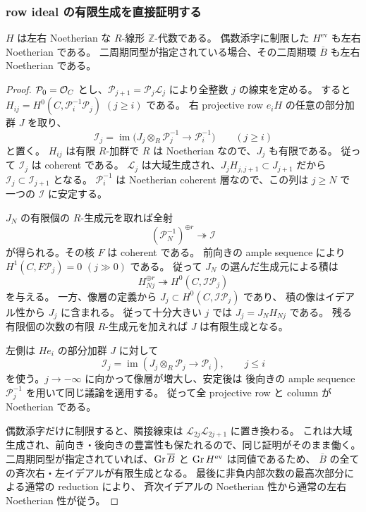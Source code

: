 \subsubsection{row ideal の有限生成を直接証明する}

\begin{lemma}\label{noeth-lem:row-noetherian}
$H$ は左右 Noetherian な $R$-線形 $\mathbb Z$-代数である。
偶数添字に制限した $H^{\mathrm{ev}}$ も左右 Noetherian である。
二周期同型が指定されている場合、その二周期環 $\overline B$ も左右 Noetherian である。
\end{lemma}

\begin{proof}
$\mathcal P_0=\mathcal O_C$ とし、$\mathcal P_{j+1}=\mathcal P_j\mathcal L_j$ により全整数 $j$ の線束を定める。
すると $H_{ij}=H^0(C,\mathcal P_i^{-1}\mathcal P_j)$ $(j\ge i)$ である。
右 projective row $e_iH$ の任意の部分加群 $J$ を取り、
\[
 \mathcal I_j=\operatorname{im}\bigl(J_j\otimes_R\mathcal P_j^{-1}\longrightarrow\mathcal P_i^{-1}\bigr)
 \qquad(j\ge i)
\]
と置く。
$H_{ij}$ は有限 $R$-加群で $R$ は Noetherian なので、$J_j$ も有限である。
従って $\mathcal I_j$ は coherent である。
$\mathcal L_j$ は大域生成され、$J_jH_{j,j+1}\subset J_{j+1}$ だから
$\mathcal I_j\subset\mathcal I_{j+1}$ となる。
$\mathcal P_i^{-1}$ は Noetherian coherent 層なので、この列は $j\ge N$ で
一つの $\mathcal I$ に安定する。

$J_N$ の有限個の $R$-生成元を取れば全射
\[
 (\mathcal P_N^{-1})^{\oplus r}\twoheadrightarrow\mathcal I
\]
が得られる。その核 $F$ は coherent である。
前向きの ample sequence により $H^1(C,F\mathcal P_j)=0$ $(j\gg0)$ である。
従って $J_N$ の選んだ生成元による積は
\[
 H_{Nj}^{\oplus r}\twoheadrightarrow H^0(C,\mathcal I\mathcal P_j)
\]
を与える。
一方、像層の定義から $J_j\subset H^0(C,\mathcal I\mathcal P_j)$ であり、
積の像はイデアル性から $J_j$ に含まれる。
従って十分大きい $j$ では $J_j=J_NH_{Nj}$ である。
残る有限個の次数の有限 $R$-生成元を加えれば $J$ は有限生成となる。

左側は $He_i$ の部分加群 $J$ に対して
\[
 \mathcal I_j=\operatorname{im}(J_j\otimes_R\mathcal P_j\longrightarrow\mathcal P_i),\qquad j\le i
\]
を使う。$j\to-\infty$ に向かって像層が増大し、安定後は
後向きの ample sequence $\mathcal P_j^{-1}$ を用いて同じ議論を適用する。
従って全 projective row と column が Noetherian である。

偶数添字だけに制限すると、隣接線束は $\mathcal L_{2j}\mathcal L_{2j+1}$ に置き換わる。
これは大域生成され、前向き・後向きの豊富性も保たれるので、同じ証明がそのまま働く。
二周期同型が指定されていれば、$\operatorname{Gr}\overline B$ と $\operatorname{Gr} H^{\mathrm{ev}}$ は同値であるため、
$\overline B$ の全ての斉次右・左イデアルが有限生成となる。
最後に非負内部次数の最高次部分による通常の reduction により、
斉次イデアルの Noetherian 性から通常の左右 Noetherian 性が従う。
\end{proof}

